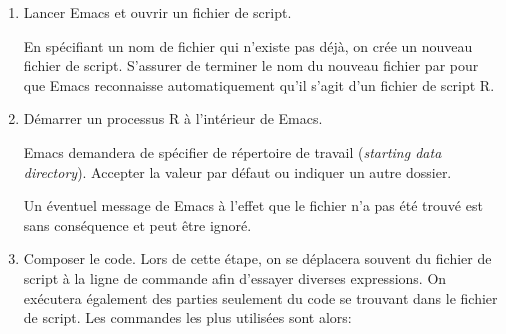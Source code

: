 \begin{enumerate}
\item Lancer Emacs et ouvrir un fichier de script.
  En spécifiant un nom de fichier qui n'existe pas déjà, on crée un
  nouveau fichier de script. S'assurer de terminer le nom du nouveau
  fichier par  pour que Emacs reconnaisse automatiquement
  qu'il s'agit d'un fichier de script R.
\item Démarrer un processus R à l'intérieur de Emacs.
  Emacs demandera de spécifier de répertoire de travail
  (\emph{starting data directory}). Accepter la valeur par défaut ou
  indiquer un autre dossier.
  Un éventuel message de Emacs à l'effet que le fichier
   n'a pas été trouvé est sans conséquence et peut
  être ignoré.
\item Composer le code. Lors de cette étape, on se déplacera souvent
  du fichier de script à la ligne de commande afin d'essayer diverses
  expressions. On exécutera également des parties seulement du code se
  trouvant dans le fichier de script. Les commandes les plus utilisées
  sont alors:
\end{enumerate}
